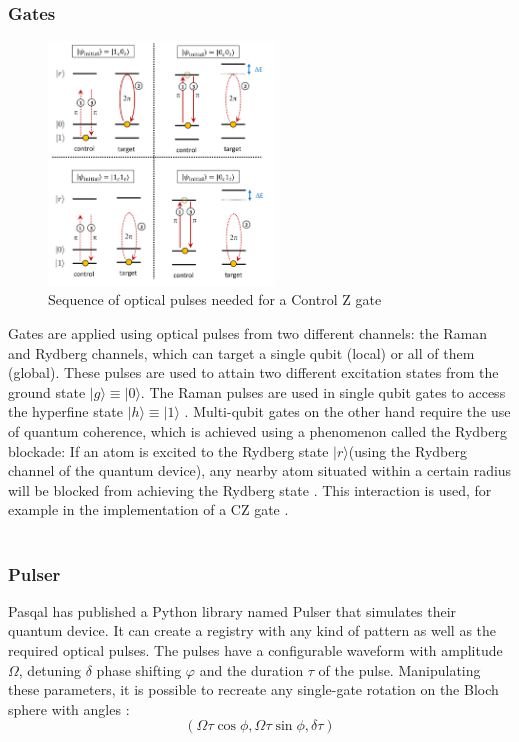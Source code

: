 \subsubsection{Gates}
\begin{figure}
  \centering
  \includegraphics[width=60mm]{./Images/CZbeams.png}
  \caption{Sequence of optical pulses needed for a Control Z gate \cite{silverioPulserOpensourcePackage2022}} 
  \label{fig:CZ}

\end{figure}
Gates are applied using optical pulses from two different channels: the Raman and Rydberg channels, which can target a single qubit (local) or all of them (global). 
These pulses are used to attain two different excitation states from the ground state $|g \rangle \equiv|0 \rangle$. The Raman pulses are used in single qubit gates to access the hyperfine state $|h \rangle \equiv |1 \rangle$ \cite{tsaiPulselevelSchedulingQuantum2022}.
Multi-qubit gates on the other hand require the use of quantum coherence, which is achieved using a phenomenon called the Rydberg blockade: If an atom is excited to the Rydberg state $|r \rangle$\cite{cohenQuantumComputingCircular2021}(using the Rydberg channel of the quantum device), any nearby atom situated
within a certain radius will be blocked from achieving the Rydberg state \cite{saffmanQuantumComputingAtomic2016}. This interaction is used, for example in the implementation of a CZ gate \cite{saffmanQuantumInformationRydberg2010}. 
\\ \\
\subsubsection{Pulser}

Pasqal has published a Python library named Pulser that simulates their quantum device. It can create a registry with any kind of pattern as well as the required optical pulses.
The pulses have a configurable waveform with amplitude $\Omega$, detuning $\delta$ phase shifting $\varphi$ and the duration $\tau$ of the pulse. Manipulating these parameters, it is possible to recreate any single-gate rotation on the
 Bloch sphere with angles :
 $$(\Omega\tau\cos\phi,\Omega\tau\sin\phi,\delta\tau)$$\cite{henrietQuantumComputingNeutral2020}
